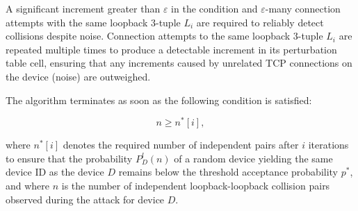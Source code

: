 \documentclass[twocolumn]{report}
\begin{document}
A significant increment greater than \(\varepsilon\) in the condition and \(\varepsilon\)-many connection attempts with the same loopback 3-tuple \(L_i\) are required to reliably detect collisions despite \alert{noise}. Connection attempts to the same loopback 3-tuple \(L_i\) are repeated \alert{multiple times} to produce a detectable increment in its perturbation table cell, ensuring that any increments caused by unrelated TCP connections on the device (noise) are outweighed.

The algorithm \alert{terminates} as soon as the following condition is satisfied:

\vspace{-0.2cm}
\begin{minipage}{\columnwidth}
	\[
		n \ge n^*[i],
	\]
\end{minipage}

where \( n^*[i] \) denotes the required \alert{number of independent pairs} after \( i \) \alert{iterations} to ensure that the \alert{probability} \( P^l_D(n) \) of a random device yielding the same device ID as the device \( D \) remains below the \alert{threshold acceptance probability} \( p^* \), and where \( n \) is the \alert{number of independent loopback-loopback collision pairs} observed during the attack for device \( D \).
\end{document}
